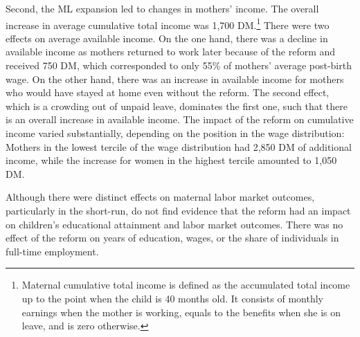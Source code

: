 Second, the ML expansion led to changes in mothers' income. The overall increase in average cumulative total income was 1,700 DM.\footnote{Maternal cumulative total income is defined as the accumulated total income up to the point when the child is 40 months old. It consists of monthly earnings when the mother is working, equals to the benefits when she is on leave, and is zero otherwise.} There were two effects on average available income. On the one hand, there was a decline in available income as mothers returned to work later because of the reform and received 750 DM, which corresponded to only 55\% of mothers' average post-birth wage. On the other hand, there was an increase in available income for mothers who would have stayed at home even without the reform. The second effect, which is a crowding out of unpaid leave, dominates the first one, such that there is an overall increase in available income. The impact of the reform on cumulative income varied substantially, depending on the position in the wage distribution: Mothers in the lowest tercile of the wage distribution had 2,850 DM of additional income, while the increase for women in the highest tercile amounted to 1,050 DM.


Although there were distinct effects on maternal labor market outcomes, particularly in the short-run, \cite{Dustmann2012} do not find evidence that the reform had an impact on children's educational attainment and labor market outcomes. There was no effect of the reform on years of education, wages, or the share of individuals in full-time employment.





 
















